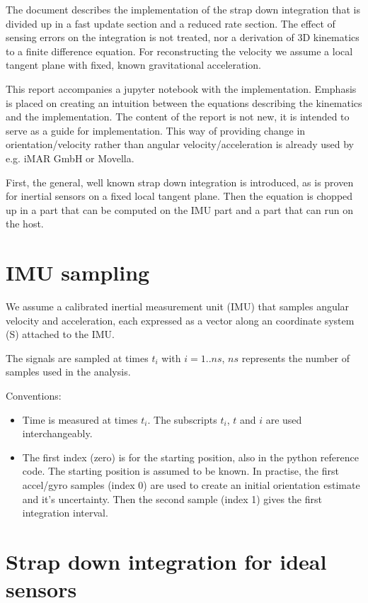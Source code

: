 \documentclass{article}
\begin{document}
The document describes the implementation of the strap down integration that is divided up in a fast update section and a reduced rate section. The effect of sensing errors on the integration is not treated, nor a derivation of 3D kinematics to a finite difference equation. For reconstructing the velocity we assume a local tangent plane with fixed, known gravitational acceleration.

This report accompanies a jupyter notebook with the implementation. Emphasis is placed on creating an intuition between the equations describing the kinematics and the implementation. The content of the report is not new, it is intended to serve as a guide for implementation. This way of providing change in orientation/velocity rather than angular velocity/acceleration is already used by e.g. iMAR GmbH or Movella.

First, the general, well known strap down integration is introduced, as is proven for inertial sensors on a fixed local tangent plane. Then  the  equation is chopped up in a part that can be computed on the IMU part and a part that can run on the host.

\section{IMU sampling}
We assume a calibrated inertial measurement unit (IMU) that samples angular velocity and acceleration, each expressed as a vector along an coordinate system (S) attached to the IMU.

The signals are sampled at times $t_i$ with $i=1..ns$, $ns$ represents the number of samples used in the analysis.

Conventions:
\begin{itemize}
\item Time is measured at times $t_i$. The subscripts $t_i$, $t$ and $i$ are used interchangeably.
\item The first index (zero) is for the starting position, also in the python reference code. The starting position is assumed to be known. In practise, the first accel/gyro samples (index 0) are used to create an initial orientation estimate and it's uncertainty. Then the second sample (index 1) gives the first integration interval.
\end{itemize}


\section{Strap down integration for ideal sensors}
\end{document}

